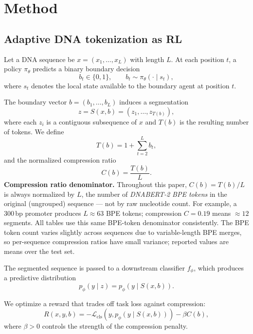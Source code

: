 \documentclass[sigconf,screen]{acmart}
\newcommand{\dnabert}{DNABERT-2\xspace}
\begin{document}
\section{Method}
\subsection{Adaptive DNA tokenization as RL}
Let a DNA sequence be $x=(x_1,\ldots,x_L)$ with length $L$. At each position $t$, a policy $\pi_\theta$ predicts a binary boundary decision
\begin{equation}
    b_t \in \{0,1\}, \qquad b_t \sim \pi_\theta(\cdot \mid s_t),
\end{equation}
where $s_t$ denotes the local state available to the boundary agent at position $t$.

The boundary vector $b=(b_1,\ldots,b_L)$ induces a segmentation
\begin{equation}
    z = S(x,b) = (z_1,\ldots,z_{T(b)}),
\end{equation}
where each $z_i$ is a contiguous subsequence of $x$ and $T(b)$ is the resulting number of tokens. We define
\begin{equation}
    T(b) = 1 + \sum_{t=2}^{L} b_t,
\end{equation}
and the normalized compression ratio
\begin{equation}
    C(b) = \frac{T(b)}{L}.
\end{equation}
\textbf{Compression ratio denominator.} Throughout this paper, $C(b) = T(b)/L$ is always normalized by $L$, the number of \emph{\dnabert BPE tokens} in the original (ungrouped) sequence — not by raw nucleotide count. For example, a 300\,bp promoter produces $L \approx 63$ BPE tokens; compression $C = 0.19$ means $\approx 12$ segments. All tables use this same BPE-token denominator consistently. The BPE token count varies slightly across sequences due to variable-length BPE merges, so per-sequence compression ratios have small variance; reported values are means over the test set.

The segmented sequence is passed to a downstream classifier $f_\phi$, which produces a predictive distribution
\begin{equation}
    p_\phi(y \mid z) = p_\phi(y \mid S(x,b)).
\end{equation}

We optimize a reward that trades off task loss against compression:
\begin{equation}
    R(x,y,b) = -\mathcal{L}_{\mathrm{cls}}\!\left(y, p_\phi(y \mid S(x,b))\right) - \beta C(b),
\end{equation}
where $\beta > 0$ controls the strength of the compression penalty.
\end{document}
